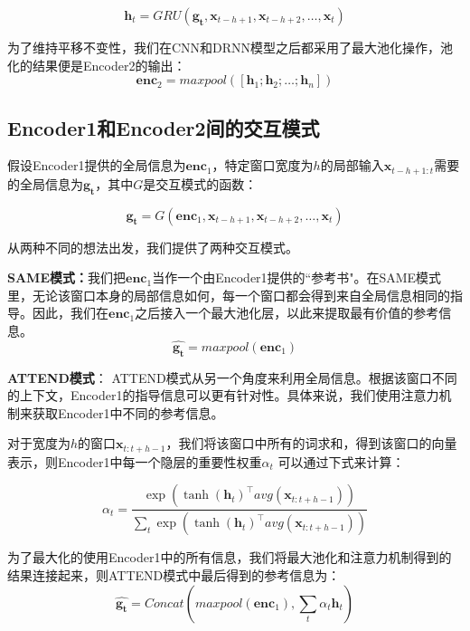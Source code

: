 \begin{equation}
\mathbf{h}_{t} = GRU(\mathbf{g_t}, \mathbf{x}_{t-h+1}, \mathbf{x}_{t-h+2}, \ldots, \mathbf{x}_{t})
\end{equation}

为了维持平移不变性，我们在CNN和DRNN模型之后都采用了最大池化操作，池化的结果便是Encoder2的输出：
\begin{equation}
\mathbf{enc}_2 = maxpool([\mathbf{h}_{1}; \mathbf{h}_{2}; \ldots; \mathbf{h}_{n}])
\end{equation}


\subsection{Encoder1和Encoder2间的交互模式}
\label{interact}

假设Encoder1提供的全局信息为$\mathbf{enc}_1$，特定窗口宽度为$h$的局部输入$\mathbf{x}_{t-h+1:t}$需要的全局信息为$\mathbf{g_t}$，其中$G$是交互模式的函数：

\begin{equation}
\mathbf{g_t} = G(\mathbf{enc}_1, \mathbf{x}_{t-h+1}, \mathbf{x}_{t-h+2}, \ldots, \mathbf{x}_{t})
\end{equation}

从两种不同的想法出发，我们提供了两种交互模式。

\textbf{SAME模式：}我们把$\mathbf{enc}_1$当作一个由Encoder1提供的``参考书"。在SAME模式里，无论该窗口本身的局部信息如何，每一个窗口都会得到来自全局信息相同的指导。因此，我们在$\mathbf{enc}_1$之后接入一个最大池化层，以此来提取最有价值的参考信息。
\begin{equation}
\hat{\mathbf{g_t}} = maxpool(\mathbf{enc}_1)
\end{equation}

\textbf{ATTEND模式}：
ATTEND模式从另一个角度来利用全局信息。根据该窗口不同的上下文，Encoder1的指导信息可以更有针对性。具体来说，我们使用注意力机制来获取Encoder1中不同的参考信息。

对于宽度为$h$的窗口$\mathbf{x}_{t:t+h-1}$，我们将该窗口中所有的词求和，得到该窗口的向量表示，则Encoder1中每一个隐层的重要性权重$\alpha_{t}$ 可以通过下式来计算：

\begin{equation}
{\alpha_{t}} = \frac{\exp({\tanh(\mathbf{h}_{t})}^\top avg(\mathbf{x}_{t:t+h-1}))} {\sum_{t} \exp({\tanh(\mathbf{h}_{t})}^\top avg(\mathbf{x}_{t:t+h-1}))}
\end{equation}

为了最大化的使用Encoder1中的所有信息，我们将最大池化和注意力机制得到的结果连接起来，则ATTEND模式中最后得到的参考信息为：
\begin{equation}
\hat{\mathbf{g_t}} = Concat(maxpool(\mathbf{enc}_1), \sum_{t} \alpha_t \mathbf{h}_{t})
\end{equation}

